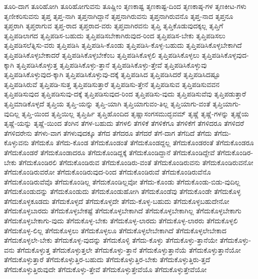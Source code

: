 {ತೂರಿ-ದಾಗ
ತೂರಿಹೋಗಿ
ತೂರಿಹೋಗುವನು
ತೂಷ್ಣೀಂ
ತೃಣಕಾಷ್ಟ
ತೃಣಕಾಷ್ಟ-ದಿಂದ
ತೃಣಕಾಷ್ಠ-ಗಳ
ತೃಣಕೀಟ-ಗಳು
ತೃಣೀಕರಿಸುವನು
ತೃಪ್ತ
ತೃಪ್ತ-ನಾಗಿ
ತೃಪ್ತನಾಗಿದ್ದಾನೆ
ತೃಪ್ತನಾಗಿರುವನು
ತೃಪ್ತನಾಗಿರುವನೊ
ತೃಪ್ತ-ನಾದ
ತೃಪ್ತನೂ
ತೃಪ್ತರಾಗಿ
ತೃಪ್ತರಾಗುವ
ತೃಪ್ತ-ರಾದ
ತೃಪ್ತರಾದ-ವರು
ತೃಪ್ತವಾಗಿರವನು
ತೃಪ್ತಿ
ತೃಪ್ತಿಕೊಡುವುದಕ್ಕಲ್ಲ
ತೃಪ್ತಿಗೆ
ತೃಪ್ತಿಪಡಿಲಾಗದ
ತೃಪ್ತಿಪಡಿಸ-ಬಹುದು
ತೃಪ್ತಿಪಡಿಸಬೇಕಾಗಿರುವುದ-ರಿಂದ
ತೃಪ್ತಿಪಡಿಸ-ಬೇಕು
ತೃಪ್ತಿಪಡಿಸಲು
ತೃಪ್ತಿಪಡಿಸಲೆತ್ನಿಸು-ವರು
ತೃಪ್ತಿಪಡಿಸಿ
ತೃಪ್ತಿಪಡಿಸಿ-ಕೊಂಡು
ತೃಪ್ತಿಪಡಿಸಿ-ಕೊಳ್ಳ-ಬಹುದು
ತೃಪ್ತಿಪಡಿಸಿಕೊಳ್ಳಬೇಕಾಗಿದೆ
ತೃಪ್ತಿಪಡಿಸಿಕೊಳ್ಳಬೇಕಾದರೆ
ತೃಪ್ತಿಪಡಿಸಿಕೊಳ್ಳಬೇಕೆಂಬ
ತೃಪ್ತಿಪಡಿಸಿಕೊಳ್ಳಲಿ
ತೃಪ್ತಿಪಡಿಸಿಕೊಳ್ಳಲು
ತೃಪ್ತಿಪಡಿಸಿಕೊಳ್ಳವುದ-ಕ್ಕಾಗಿ
ತೃಪ್ತಿಪಡಿಸಿಕೊಳ್ಳುತ್ತ
ತೃಪ್ತಿಪಡಿಸಿಕೊಳ್ಳು-ತ್ತಾನೆ
ತೃಪ್ತಿಪಡಿಸಿಕೊಳ್ಳು-ತ್ತೇವೆ
ತೃಪ್ತಿಪಡಿಸಿಕೊಳ್ಳುವು
ತೃಪ್ತಿಪಡಿಸಿಕೊಳ್ಳುವುದ-ಕ್ಕಾಗಿ
ತೃಪ್ತಿಪಡಿಸಿಕೊಳ್ಳುವು-ದಕ್ಕೆ
ತೃಪ್ತಿಪಡಿಸಿದ
ತೃಪ್ತಿಪಡಿಸಿದರೆ
ತೃಪ್ತಿಪಡಿಸಿದಷ್ಟೂ
ತೃಪ್ತಿಪಡಿಸಿರುವೆ
ತೃಪ್ತಿಪಡಿ-ಸುತ್ತ
ತೃಪ್ತಿಪಡಿಸುತ್ತಾರೆ
ತೃಪ್ತಿಪಡಿಸು-ತ್ತೇನೆ
ತೃಪ್ತಿಪಡಿಸುವ
ತೃಪ್ತಿಪಡಿಸುವವನ
ತೃಪ್ತಿಪಡಿಸುವುದ
ತೃಪ್ತಿಪಡಿಸುವು-ದಕ್ಕೆ
ತೃಪ್ತಿಪಡಿಸುವುದ-ರಿಂದ
ತೃಪ್ತಿಪಡಿಸು-ವುದು
ತೃಪ್ತಿಪಡಿಸುವೆವು
ತೃಪ್ತಿಪಡುತ್ತಾರೆ
ತೃಪ್ತಿಮಾಡಿಕೊಳ್ಳದೆ
ತೃಪ್ತಿಯ
ತೃಪ್ತಿ-ಯನ್ನು
ತೃಪ್ತಿ-ಯಾಗಿ
ತೃಪ್ತಿಯಾಗುವಂ-ತಿಲ್ಲ
ತೃಪ್ತಿಯಾಗು-ವಂತೆ
ತೃಪ್ತಿಯಾಗು-ವುದಿಲ್ಲ
ತೃಪ್ತಿ-ಯಿಂದ
ತೃಪ್ತಿಯಿಲ್ಲ
ತೃಪ್ತಿರ್ಹಿ
ತೃಪ್ತಿಹೊಂದಿದ
ತೃಷ್ಣಾಸಂಗಸಮುದ್ಭವಮ್
ತೃಷ್ಣೆ
ತೃಷ್ಣೆ-ಗಳನ್ನು
ತೃಷ್ಣೆಯ
ತೃಷ್ಣೆ-ಯನ್ನು
ತೃಷ್ಣೆ-ಯಿಂದ
ತೆಂಗಿನ
ತೆಗಳ-ಬಹುದು
ತೆಗಳಲಿ
ತೆಗಳಿಕೆ
ತೆಗಳಿಕೆಗೂ
ತೆಗಳಿಕೆಗೆ
ತೆಗಳಿದರೂ
ತೆಗಳಿದರೆ
ತೆಗಳಿದರೇನು
ತೆಗಳು-ವಾಗ
ತೆಗಳುವುದಕ್ಕೂ
ತೆಗೆದ
ತೆಗೆದರೂ
ತೆಗೆದರೆ
ತೆಗೆ-ದಾಗ
ತೆಗೆದಿದೆ
ತೆಗೆದು
ತೆಗೆದು-ಕೊಳ್ಳುವನು
ತೆಗೆದುಕೊ
ತೆಗೆದು-ಕೊಂಡ
ತೆಗೆದುಕೊಂಡಂತೆ
ತೆಗೆದುಕೊಂಡದ್ದಲ್ಲ
ತೆಗೆದುಕೊಂಡರಂತೆ
ತೆಗೆದುಕೊಂಡರೂ
ತೆಗೆದುಕೊಂಡರೆ
ತೆಗೆದುಕೊಂಡಾದರೂ
ತೆಗೆದುಕೊಂಡಿದ್ದಕ್ಕೆ
ತೆಗೆದುಕೊಂಡಿದ್ದಾನೆ
ತೆಗೆದುಕೊಂಡಿದ್ದೇವೆ
ತೆಗೆದುಕೊಂಡಿರ-ಬೇಕು
ತೆಗೆದುಕೊಂಡಿರಲಿ
ತೆಗೆದುಕೊಂಡಿರುವ
ತೆಗೆದುಕೊಂಡಿರು-ವಂತೆ
ತೆಗೆದುಕೊಂಡಿರುವನು
ತೆಗೆದುಕೊಂಡಿರುವನೋ
ತೆಗೆದುಕೊಂಡಿರುವರೋ
ತೆಗೆದುಕೊಂಡಿರುವುದ-ರಿಂದ
ತೆಗೆದುಕೊಂಡಿರುವೆ
ತೆಗೆದುಕೊಂಡಿರುವೆನೊ
ತೆಗೆದುಕೊಂಡಿರುವೆವೊ
ತೆಗೆದುಕೊಂಡಿಲ್ಲ
ತೆಗೆದುಕೊಂಡಿಲ್ಲವೋ
ತೆಗೆದು-ಕೊಂಡು
ತೆಗೆದುಕೊಂಡು-ಬಿಡು-ವುದಿಲ್ಲ
ತೆಗೆದುಕೊಂಡುದನ್ನು
ತೆಗೆದುಕೊಂಡುದು
ತೆಗೆದುಕೊಂಡುಹೋಗಿ
ತೆಗೆದುಕೊಂಡೆವು
ತೆಗೆದುಕೊಂಡೇ
ತೆಗೆದುಕೊಳ್ಳ
ತೆಗೆದುಕೊಳ್ಳಕೂಡದು
ತೆಗೆದುಕೊಳ್ಳದೆ
ತೆಗೆದುಕೊಳ್ಳದೇ
ತೆಗೆದು-ಕೊಳ್ಳ-ಬಹುದು
ತೆಗೆದುಕೊಳ್ಳಬಹುದೇನೋ
ತೆಗೆದುಕೊಳ್ಳಬಾರದು
ತೆಗೆದುಕೊಳ್ಳಬೇಕಷ್ಟೆ
ತೆಗೆದುಕೊಳ್ಳಬೇಕಾಗಿದೆ
ತೆಗೆದುಕೊಳ್ಳಬೇಕಾಗಿಲ್ಲ
ತೆಗೆದುಕೊಳ್ಳಬೇಕಾಗು
ತೆಗೆದುಕೊಳ್ಳಬೇಕಾಗು-ವುದು
ತೆಗೆದುಕೊಳ್ಳ-ಬೇಕು
ತೆಗೆದುಕೊಳ್ಳ-ಲಾರದು
ತೆಗೆದುಕೊಳ್ಳ-ಲಾರರು
ತೆಗೆದುಕೊಳ್ಳಲಿ
ತೆಗೆದುಕೊಳ್ಳ-ಲಿಲ್ಲ
ತೆಗೆದುಕೊಳ್ಳಲು
ತೆಗೆದುಕೊಳ್ಳಲೂ
ತೆಗೆದುಕೊಳ್ಳಲೇಬೇಕಾಗಿದೆ
ತೆಗೆದುಕೊಳ್ಳಲೇಬೇಕಾದ
ತೆಗೆದುಕೊಳ್ಳಲೇ-ಬೇಕು
ತೆಗೆದುಕೊಳ್ಳ-ವುದನ್ನು
ತೆಗೆದುಕೊಳ್ಳಿ
ತೆಗೆದು-ಕೊಳ್ಳು
ತೆಗೆದುಕೊಳ್ಳು-ತ್ತಾನೆಯೇ
ತೆಗೆದುಕೊಳ್ಳು-ವನು
ತೆಗೆದುಕೊಳ್ಳುತ್ತ
ತೆಗೆದುಕೊಳ್ಳುತ್ತಲೇ
ತೆಗೆದುಕೊಳ್ಳು-ತ್ತಾನೆ
ತೆಗೆದುಕೊಳ್ಳುತ್ತಾನೆಯೆ
ತೆಗೆದುಕೊಳ್ಳುತ್ತಾನೆಯೋ
ತೆಗೆದುಕೊಳ್ಳುತ್ತಾರೆ
ತೆಗೆದುಕೊಳ್ಳುತ್ತಿರ-ಬಹುದು
ತೆಗೆದುಕೊಳ್ಳುತ್ತಿರ-ಬೇಕು
ತೆಗೆದುಕೊಳ್ಳುತ್ತಿರು-ತ್ತದೆ
ತೆಗೆದುಕೊಳ್ಳುತ್ತಿರುವುದೇ
ತೆಗೆದುಕೊಳ್ಳು-ತ್ತೇವೆ
ತೆಗೆದುಕೊಳ್ಳುತ್ತೇವೆಯೊ
ತೆಗೆದುಕೊಳ್ಳುತ್ತೇವೆಯೋ
}
